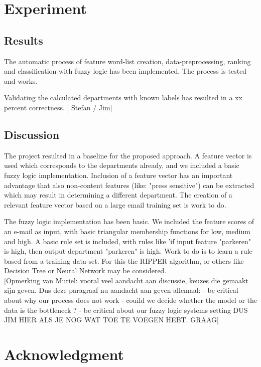 \documentclass[journal]{IEEEtran}
\begin{document}
\section{Experiment}

\subsection{Results}

The automatic process of feature word-list creation, data-preprocessing, ranking and classification with fuzzy logic has been implemented. The process is tested and works.

Validating the calculated departments with known labels has resulted in a xx percent correctness. [ Stefan / Jim]

\subsection{Discussion}

The project resulted in a baseline for the proposed approach. A feature vector is used which corresponds to the departments already, and we included a basic fuzzy logic implementation. Inclusion of a feature vector has an important advantage that also non-content features (like: "press sensitive") can be extracted which may result in determining a different department. The creation of a relevant feature vector based on a large email training set is work to do. 

The fuzzy logic implementation has been basic. We included the feature scores of an e-mail as input, with basic triangular membership functions for low, medium and high. A basic rule set is included, with rules like 'if input feature "parkeren" is high, then output department "parkeren" is high. Work to do is to learn a rule based from a training data-set. For this the RIPPER algorithm, or others like Decision Tree or Neural Network may be considered. \cite{rulelearning}\cite{ripper}\\



[Opmerking van Muriel: vooral veel aandacht aan discussie, keuzes die gemaakt zijn geven. Dus deze paragraaf nu aandacht aan geven allemaal: 
- be critical about why our process does not work
- couild we decide whether the model or the data is the bottleneck ? 
- be critical about our fuzzy logic systems setting
DUS JIM HIER ALS JE NOG WAT TOE TE VOEGEN HEBT. GRAAG]


\section{Acknowledgment}
\end{document}
